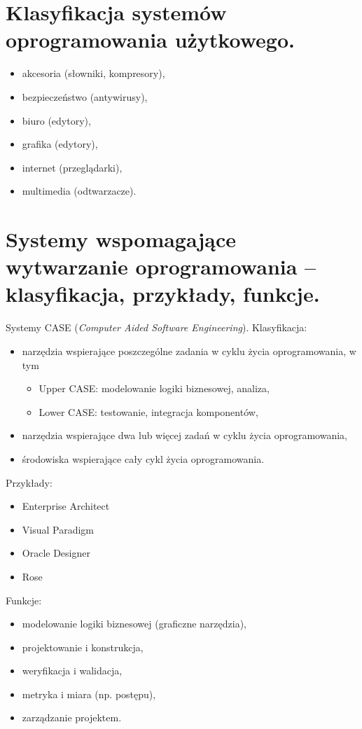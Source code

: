 \documentclass[12pt,a4paper]{article}
\begin{document}
	\section{Klasyfikacja systemów oprogramowania użytkowego.}
	\begin{itemize}
		\item akcesoria (słowniki, kompresory),
		\item bezpieczeństwo (antywirusy),
		\item biuro (edytory),
		\item grafika (edytory),
		\item internet (przeglądarki),
		\item multimedia (odtwarzacze).
	\end{itemize}

	\section{Systemy wspomagające wytwarzanie oprogramowania – klasyfikacja, przykłady, funkcje.}
	Systemy CASE (\textit{Computer Aided Software Engineering}). Klasyfikacja:
	\begin{itemize}
		\item narzędzia wspierające poszczególne zadania w cyklu życia oprogramowania, w tym
		\begin{itemize}
			\item Upper CASE: modelowanie logiki biznesowej, analiza,
			\item Lower CASE: testowanie, integracja komponentów,
		\end{itemize}
		\item narzędzia wspierające dwa lub więcej zadań w cyklu życia oprogramowania,
		\item środowiska wspierające cały cykl życia oprogramowania.
	\end{itemize}
	
	Przykłady:
	\begin{itemize}
		\item Enterprise Architect
		\item Visual Paradigm
		\item Oracle Designer
		\item Rose
	\end{itemize}

	Funkcje:
	\begin{itemize}
		\item modelowanie logiki biznesowej (graficzne narzędzia),
		\item projektowanie i konstrukcja,
		\item weryfikacja i walidacja,
		\item metryka i miara (np. postępu),
		\item zarządzanie projektem.
	\end{itemize}
\end{document}
